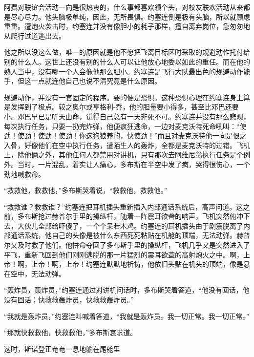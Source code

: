     阿费对联谊会活动一向是很热衷的，什么事都喜欢领个头，对校友联欢活动从来都是尽心尽力。他头脑极单纯，因此，无所畏惧。约塞连倒是极有头脑，所以就顾虑重重。遭炮火袭击时，约塞连并没有像胆小的耗子那样，擅自离弃岗位，急匆匆地从爬行过道逃出去。

    他之所以没这么做，唯一的原因就是他不愿把飞离目标区时采取的规避动作托付给别的什么人。这世上还没有别的什么人可以让他放心地委以如此的重任。而在他的熟人当中，没有哪一个人会像他那么胆小。约塞连是飞行大队最出色的规避动作能手，但这一点就连他自己也说不清究竟是什么原因。

    规避动作，并没有一套固定的程序。要的便是恐惧。这种恐惧心理在约塞连身上算是发挥到了极点。较之奥尔或亨格利-乔，他的胆量要小得多，甚至比邓巴还要小。邓巴早已是听天由命，觉得自己总有一天非死不可。约塞连并没有那么悲观，每次执行任务，只要一扔完炸弹，他便疯狂逃命，一边对麦克沃特死命吼叫：“使劲！使劲！使劲！使劲！你这狗狼养的，快使劲！”而且对麦克沃特他一向是恨之入骨，好像他们在空中执行任务，遭陌生人的轰炸，全都是麦克沃特的过错。飞机上，除他俩之外，其他任何人都禁用对讲机，只有那次去阿维尼翁执行任务是个例外。当时，一片混乱，着实让人痛心，多布斯在半空中发了疯，哭得很伤心，一个劲地喊救命。

    “救救他，救救他，”多布斯哭着说，“救救他，救救他。”

    “救救谁？救救谁？”约塞连把耳机插头重新插入内部通话系统后，高声问道。这之前，多布斯抢过赫普尔手里的操纵杆，随着一阵震耳欲聋的响声，飞机突然俯冲下去，大伙儿全部给吓傻了，一个个呆若木鸡。约塞连的耳机插头由于剧震脱离了内部通话系统，他自己的头像是被什么东西死死粘贴在机舱的顶端，无法动弹。赫普尔又及时救了他们。他拼命夺回了多布斯手里的操纵杆，飞机几乎又是突然进入了平飞，重新飞回到他们刚刚逃脱的那一片猛烈的震耳欲聋的高射炮火之中。啊，上帝！啊，上帝！啊，上帝！约塞连默默地祈祷，他依旧头贴在机头的顶端，像是悬在空中，无法动弹。

    “轰炸员，轰炸员，”约塞连通过对讲机问话时，多布斯哭着答道，“他没有回话，他没有回话；快救救轰炸员，快救救轰炸员。”

    “我就是轰炸员，”约塞连叫喊着答道，“我就是轰炸员。我一切正常。我一切正常。”

    “那就快救救他，快救救他，”多布斯哀求道。

    这时，斯诺登正奄奄一息地躺在尾舱里
